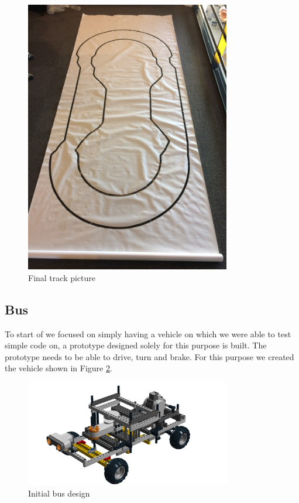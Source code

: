 \begin{figure}[H]
    \centering
    \includegraphics[width=0.8\textwidth, angle=270]{Images/Tracks/FinalTrack.jpg}
    \caption{Final track picture}
    \label{FinalTrackLayout}
\end{figure}

\subsection{Bus}
To start of we focused on simply having a vehicle on which we were able to test simple code on, a prototype designed solely for this purpose is built. The prototype needs to be able to drive, turn and brake. For this purpose we created the vehicle shown in Figure \ref{bus1Design}.

\begin{figure}[H]
    \centering
    \includegraphics[width=0.8\textwidth]{Images/implementation/6.png}
    \caption{Initial bus design}
    \label{bus1Design}
\end{figure}


